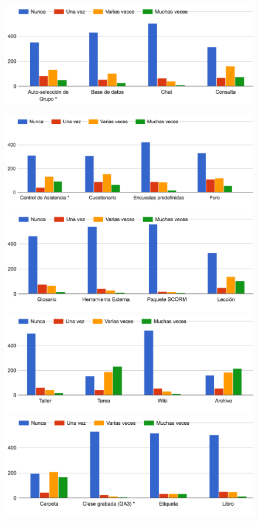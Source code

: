 \begin{enumerate}
\begin{figure}[H]
\includegraphics[width=1.0\textwidth]{../charts/05_actividades_01}
\end{figure}
\begin{figure}[H]
\includegraphics[width=1.0\textwidth]{../charts/05_actividades_02}
\includegraphics[width=1.0\textwidth]{../charts/05_actividades_03}
\includegraphics[width=1.0\textwidth]{../charts/05_actividades_04}
\includegraphics[width=1.0\textwidth]{../charts/05_actividades_05}

\end{figure}
\end{enumerate}
